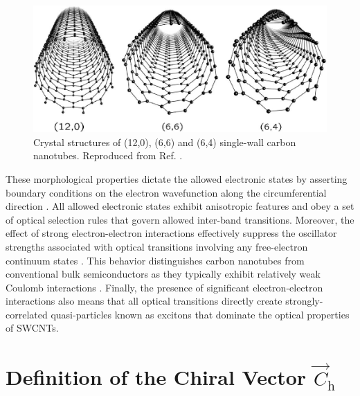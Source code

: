 \begin{figure}[h]
	\centering
	\includegraphics[scale=0.4]{images/chapter_optical_props/nanotube_symmetries_charlier}
	\caption{Crystal structures of (12,0), (6,6) and (6,4) single-wall carbon nanotubes. Reproduced from Ref. \cite{charlier2007electronic}.}
	\label{fig:symmetries}
\end{figure}
These morphological properties dictate the allowed electronic states by asserting boundary conditions on the electron wavefunction along the circumferential direction \cite{charlier2007electronic}. All allowed electronic states exhibit anisotropic features and obey a set of optical selection rules that govern allowed inter-band transitions. Moreover, the effect of strong electron-electron interactions effectively suppress the oscillator strengths associated with optical transitions involving any free-electron continuum states \cite{ando1997excitons}. This behavior distinguishes carbon nanotubes from conventional bulk semiconductors as they typically exhibit relatively weak Coulomb interactions \cite{ando1997excitons}. Finally, the presence of significant electron-electron interactions also means that all optical transitions directly create strongly-correlated quasi-particles known as excitons that dominate the optical properties of SWCNTs.


\section{Definition of the Chiral Vector $\vec{C}_\text{h}$}

